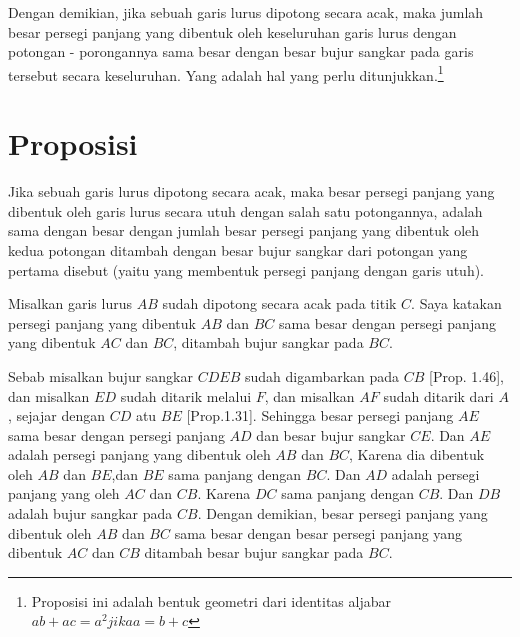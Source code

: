 \documentclass[a4paper]{book}
\begin{document}
Dengan demikian, jika sebuah garis lurus dipotong secara acak, maka jumlah besar
persegi panjang yang dibentuk oleh keseluruhan garis lurus dengan potongan -
porongannya sama besar dengan besar bujur sangkar pada garis tersebut secara 
keseluruhan. Yang adalah hal yang perlu ditunjukkan.\footnote{Proposisi
ini adalah bentuk geometri dari identitas aljabar $ab + ac = a^2 jika
a  = b + c$}
 

\section*{\centering Proposisi \thesection} 
Jika sebuah garis lurus dipotong secara acak, maka besar persegi panjang yang dibentuk
oleh garis lurus secara utuh dengan salah satu potongannya, adalah sama dengan besar
dengan jumlah besar persegi panjang yang dibentuk oleh kedua potongan ditambah
dengan besar bujur sangkar dari potongan yang pertama disebut (yaitu yang membentuk 
persegi panjang dengan garis utuh).
\begin{center}
\end{center}
Misalkan garis lurus $AB$ sudah dipotong secara acak pada titik $C$. Saya katakan 
persegi panjang yang dibentuk $AB$ dan $BC$ sama besar dengan persegi panjang 
yang dibentuk $AC$ dan $BC$, ditambah bujur sangkar pada $BC$.

Sebab misalkan bujur sangkar $CDEB$ sudah digambarkan pada $CB$ [Prop. 1.46], 
dan misalkan $ED$ sudah ditarik melalui $F$, dan misalkan $AF$ sudah 
ditarik dari $A$, sejajar dengan $CD$ atu $BE$ [Prop.1.31]. Sehingga besar
persegi panjang $AE$ sama besar dengan persegi panjang $AD$ dan besar 
bujur sangkar $CE$. Dan $AE$ adalah persegi panjang yang dibentuk oleh
$AB$ dan $BC$, Karena dia dibentuk oleh $AB$ dan $BE$,dan $BE$ sama panjang
dengan $BC$. Dan $AD$ adalah persegi panjang yang oleh $AC$ dan $CB$. Karena
$DC$ sama panjang dengan $CB$. Dan $DB$ adalah bujur sangkar pada $CB$. Dengan
demikian, besar persegi panjang yang dibentuk oleh $AB$ dan $BC$ sama besar 
dengan besar persegi panjang yang dibentuk $AC$ dan $CB$ ditambah besar bujur
sangkar pada $BC$.
\end{document}
